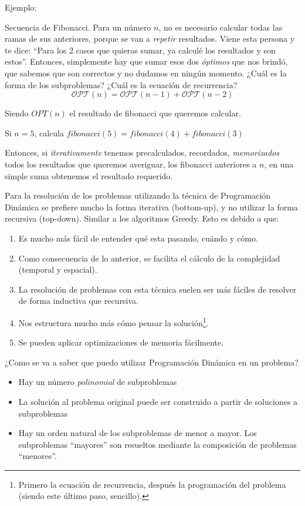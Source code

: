 \noindent Ejemplo: 

Secuencia de Fibonacci. Para un número $n$, no es necesario calcular todas las ramas de sus anteriores, porque se van a \textit{repetir} resultados. Viene esta persona y te dice: ``Para los 2 casos que quieras sumar, ya calculé los resultados y son estos''. Entonces, simplemente hay que sumar esos dos \textit{óptimos} que nos brindó, que sabemos que son correctos y no dudamos en ningún momento.
¿Cuál es la forma de los subproblemas? ¿Cuál es la ecuación de recurrencia?
\begin{equation*} 
    \mathcal{OPT}(n) = \mathcal{OPT}(n-1) + \mathcal{OPT}(n-2)
\end{equation*}

Siendo $OPT(n)$ el resultado de fibonacci que queremos calcular. 

Si $n = 5$, calcula $fibonacci(5) = fibonacci(4) + fibonacci(3)$ 

Entonces, si \textit{iterativamente} tenemos precalculados, recordados, \textit{memorizados} todos los resultados que queremos averiguar, los fibonacci anteriores a $n$, en una simple suma obtenemos el resultado requerido. 

Para la resolución de los problemas utilizando la técnica de Programación Dinámica se prefiere mucho la forma iterativa (bottom-up), y no utilizar la forma recursiva (top-down). Similar a los algoritmos Greedy.
Esto es debido a que:
\begin{enumerate}
    \item Es mucho más fácil de entender qué esta pasando, cuándo y cómo.
    \item Como consecuencia de lo anterior, se facilita el cálculo de la complejidad (temporal y espacial).
    \item La resolución de problemas con esta técnica suelen ser más fáciles de resolver de forma inductiva que recursiva.
    \item Nos estructura mucho más cómo pensar la solución\footnote{Primero la ecuación de recurrencia, después la programación del problema (siendo este último paso, sencillo).}.
    \item Se pueden aplicar optimizaciones de memoria fácilmente.
\end{enumerate}

¿Como se va a saber que puedo utilizar Programación Dinámica en un problema?
\begin{itemize}
    \item Hay un número \textit{polinomial} de subproblemas
    \item La solución al problema original puede ser construido a partir de soluciones a subproblemas
    \item Hay un orden natural de los subproblemas de menor a mayor. Los subproblemas “mayores” son resueltos mediante la composición de problemas “menores”.
\end{itemize}


